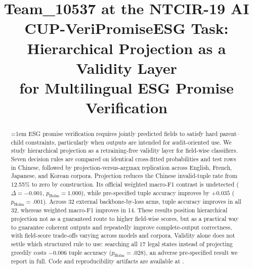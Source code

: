 \documentclass[sigconf,article]{acmart}
\begin{document}
\title[Hierarchical Projection as a Validity Layer]{Team\_10537 at the NTCIR-19
  AI CUP-VeriPromiseESG Task:\texorpdfstring{\\}{ }Hierarchical Projection as a
  Validity Layer\texorpdfstring{\\}{ }for Multilingual ESG Promise Verification}



\begin{abstract}
\emergencystretch=1em
ESG promise verification requires jointly predicted fields to satisfy hard
parent--child constraints, particularly when outputs are intended for
audit-oriented use. We study hierarchical projection as a retraining-free
validity layer for field-wise classifiers. Seven decision rules are compared
on identical cross-fitted probabilities and test rows in Chinese, followed by
projection-versus-argmax replication across English, French, Japanese, and
Korean corpora. Projection reduces the Chinese invalid-tuple rate from
12.55\% to zero by construction. Its official weighted macro-F1 contrast is
undetected ($\Delta=-0.001$, $p_{\mathrm{Holm}}=1.000$), while pre-specified
tuple accuracy improves by $+0.035$ ($p_{\mathrm{Holm}}=.001$). Across 32
external backbone-by-loss arms, tuple accuracy improves in all 32, whereas
weighted macro-F1 improves in 14. These results position hierarchical
projection not as a guaranteed route to higher field-wise scores, but as a
practical way to guarantee coherent outputs and repeatedly improve
complete-output correctness, with field-score trade-offs varying across
models and corpora. Validity alone does not settle which structured rule to
use: searching all 17 legal states instead of projecting greedily costs
$-0.006$ tuple accuracy ($p_{\mathrm{Holm}}=.028$), an adverse pre-specified
result we report in full. Code and reproducibility artifacts are available at
\repourl.
\end{abstract}


\maketitle
{}
\pagestyle{plain}
\thispagestyle{plain}

\end{document}
